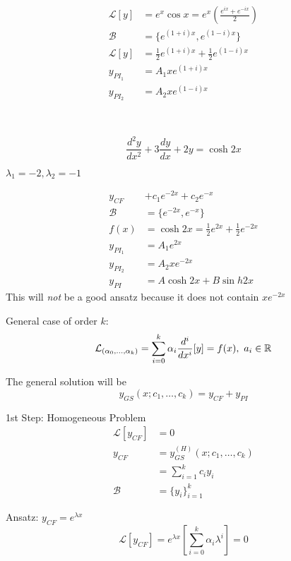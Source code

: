 \documentclass[10pt]{scrartcl}
\begin{document}
\begin{example}
\[
\begin{aligned}
  \mathcal{L}[y] &= e^x\cos x = e^x\left(\frac{e^{ix} + e^{-ix}}{2}\right)\\
  \mathcal{B} &= \{e^{(1+i)x},e^{(1-i)x}\}\\
  \mathcal{L}[y] &= \frac{1}{2}e^{(1+i)x} + \frac{1}{2}e^{(1-i)x}\\
  y_{PI_1} &= A_1xe^{(1+i)x}\\
  y_{PI_2} &= A_2xe^{(1-i)x}
\end{aligned}
\]
\end{example}~\vspace*{5pt}

\begin{example}
\[\frac{d^2y}{dx^2} + 3\frac{dy}{dx} + 2y = \cosh 2x\]	

$\lambda_1 = -2, \lambda_2 = -1$

\[
\begin{aligned}
  y_{CF} &+ c_1e^{-2x} + c_2e^{-x}\\
  \mathcal{B} &= \{e^{-2x},e^{-x}\}\\
  f(x) &= \cosh 2x = \frac{1}{2}e^{2x} + \frac{1}{2}e^{-2x}\\
  y_{PI_1} &= A_1e^{2x}\\
  y_{PI_2} &= A_2xe^{-2x}\\
  y_{PI} &= A\cosh 2x + B\sin h 2x 
\end{aligned}
\]
This will \emph{not} be a good ansatz because it does not contain $xe^{-2x}$

\end{example}


General  case of order $k$: 
\[\mathcal{L}_{(\alpha_0,\dots,\alpha_k)} = \sum_{i=0}^k \alpha_i\frac{d^i}{dx^i}[y] = f(x),~ a_i\in\mathbb{R}\]

The general solution will be
\[y_{GS}(x;c_1,\dots,c_k) = y_{CF} + y_{PI}\]

1st Step: Homogeneous Problem
\[
\begin{aligned}
  \mathcal{L}[y_{CF}] &= 0\\
  y_{CF} &= y_{GS}^{(H)}(x;c_1,\dots,c_k)\\
  &= \sum_{i=1}^kc_iy_i\\
  \mathcal{B} &= \{y_i\}_{i=1}^{k}
\end{aligned}
\]

Ansatz: $y_{CF} = e^{\lambda x}$
\[\mathcal{L}[y_{CF}] = e^{\lambda x}\left[\sum_{i=0}^k\alpha_i\lambda^i\right] = 0\]
\end{document}
